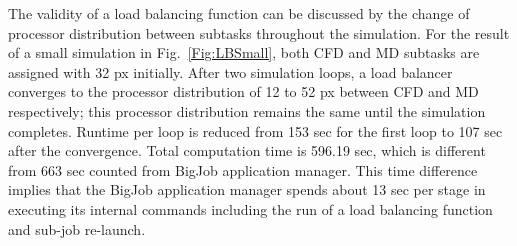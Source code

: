 \documentclass[conference,final]{IEEEtran}
\newcommand{\jhanote}[1]{ {\textcolor{red} { ***Jha: #1 }}}
\newcommand{\jhanote}[1]{}
\begin{document}
The validity of a load balancing function can be discussed by the
change of processor distribution between subtasks throughout the
simulation. For the result of a small simulation in
Fig.~\ref{Fig:LBSmall}, both CFD and MD subtasks are assigned with 32
px initially. After two simulation loops, a load balancer
converges to the processor distribution of 12 to 52 px between
CFD and MD respectively; this processor distribution remains the same
until the simulation completes. Runtime per loop is reduced from 153
sec for the first loop to 107 sec after the convergence. Total
computation time is 596.19 sec, which is different from 663
sec counted from BigJob application manager. This time difference
implies that the BigJob application manager spends about 13 sec
per stage in executing its internal commands including the run of a
load balancing function and sub-job re-launch. %
\end{document}
